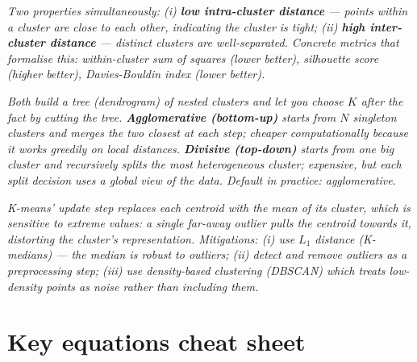 \documentclass[11pt, a4paper]{article}
\begin{document}
\begin{exambox}
\textit{Two properties simultaneously: (i) \textbf{low intra-cluster distance} — points within a cluster are close to each other, indicating the cluster is tight; (ii) \textbf{high inter-cluster distance} — distinct clusters are well-separated. Concrete metrics that formalise this: within-cluster sum of squares (lower better), silhouette score (higher better), Davies-Bouldin index (lower better).}
\end{exambox}

\begin{exambox}
\textit{Both build a tree (dendrogram) of nested clusters and let you choose $K$ after the fact by cutting the tree. \textbf{Agglomerative (bottom-up)} starts from $N$ singleton clusters and merges the two closest at each step; cheaper computationally because it works greedily on local distances. \textbf{Divisive (top-down)} starts from one big cluster and recursively splits the most heterogeneous cluster; expensive, but each split decision uses a global view of the data. Default in practice: agglomerative.}
\end{exambox}

\begin{exambox}
\textit{K-means' update step replaces each centroid with the \emph{mean} of its cluster, which is sensitive to extreme values: a single far-away outlier pulls the centroid towards it, distorting the cluster's representation. Mitigations: (i) use $L_1$ distance (K-medians) — the median is robust to outliers; (ii) detect and remove outliers as a preprocessing step; (iii) use density-based clustering (DBSCAN) which treats low-density points as noise rather than including them.}
\end{exambox}

\section*{Key equations cheat sheet}
\end{document}
